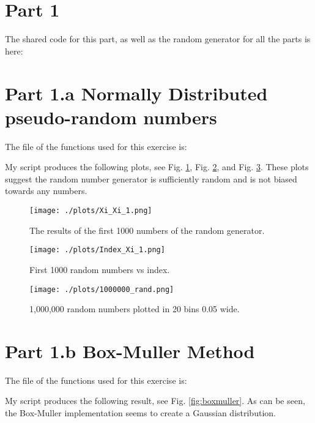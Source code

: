 \section{Part 1}

The shared code for this part, as well as the random generator for all the parts is here:



\section{Part 1.a Normally Distributed pseudo-random numbers}

The file of the functions used for this exercise is:



My script produces the following plots, see Fig. \ref{fig:xi_xi}, Fig. \ref{fig:thousand}, and Fig. \ref{fig:million}.
These plots suggest the random number generator is sufficiently random and is not biased towards any numbers.

\begin{figure}[h!]
  \centering
  \texttt{[image: ./plots/Xi\_Xi\_1.png]}
  \caption{The results of the first 1000 numbers of the random generator. }
  \label{fig:xi_xi}
\end{figure}

\begin{figure}[h!]
  \centering
  \texttt{[image: ./plots/Index\_Xi\_1.png]}
  \caption{First 1000 random numbers vs index.}
  \label{fig:thousand}
\end{figure}

\begin{figure}[h!]
  \centering
  \texttt{[image: ./plots/1000000\_rand.png]}
  \caption{1,000,000 random numbers plotted in 20 bins 0.05 wide.}
  \label{fig:million}
\end{figure}


\section{Part 1.b Box-Muller Method}

The file of the functions used for this exercise is:



My script produces the following result, see Fig. \ref{fig:boxmuller}. As can be seen, the Box-Muller implementation seems
to create a Gaussian distribution.

